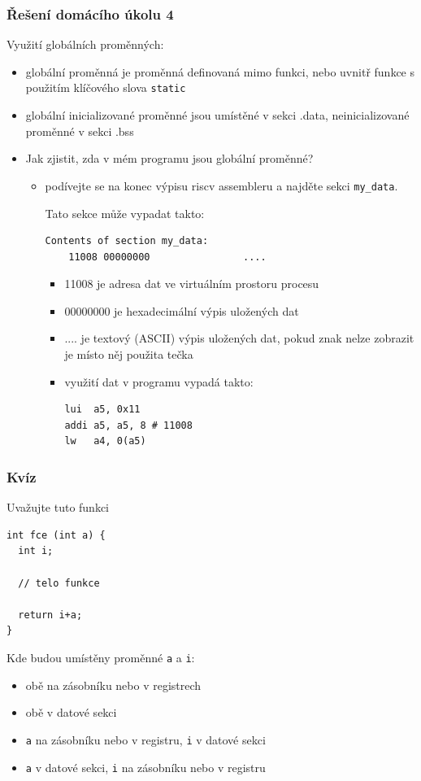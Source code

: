 \documentclass{beamer}
\begin{document}
\begin{frame}[fragile,shrink=5]
\frametitle{Řešení domácího úkolu 4}

Využití globálních proměnných:
\begin{itemize}
\item globální proměnná je proměnná definovaná mimo funkci, nebo uvnitř funkce s použitím klíčového slova \texttt{static}
\item globální inicializované proměnné jsou umístěné v sekci .data, neinicializované proměnné v sekci .bss
\item Jak zjistit, zda v mém programu jsou globální proměnné?
 \begin{itemize}
 \item podívejte se na konec výpisu riscv assembleru a najděte sekci \texttt{my\_data}.
 
 Tato sekce může vypadat takto:
\begin{verbatim}
Contents of section my_data:
    11008 00000000                ....
\end{verbatim}
\begin{itemize}
 \item 11008 je adresa dat ve virtuálním prostoru procesu
 \item 00000000 je hexadecimální výpis uložených dat
 \item .... je textový (ASCII) výpis uložených dat, pokud znak nelze zobrazit je místo něj použita tečka
 \item využití dat v programu vypadá takto:
\begin{verbatim}
lui  a5, 0x11
addi a5, a5, 8 # 11008
lw   a4, 0(a5)
\end{verbatim}
 \end{itemize}
 \end{itemize}
 \end{itemize}
\end{frame}


\begin{frame}[fragile]
\frametitle{Kvíz}

Uvažujte tuto funkci
\begin{verbatim}
int fce (int a) {
  int i;
  
  // telo funkce
  
  return i+a;
}
\end{verbatim}
Kde budou umístěny proměnné \texttt{a} a \texttt{i}:
\begin{itemize}
 \item[A] obě na zásobníku nebo v registrech
 \item[B] obě v datové sekci
 \item[C] \texttt{a} na zásobníku nebo v registru, \texttt{i} v datové sekci
 \item[D] \texttt{a} v datové sekci, \texttt{i} na zásobníku nebo v registru
\end{itemize}
\end{frame}
\end{document}

